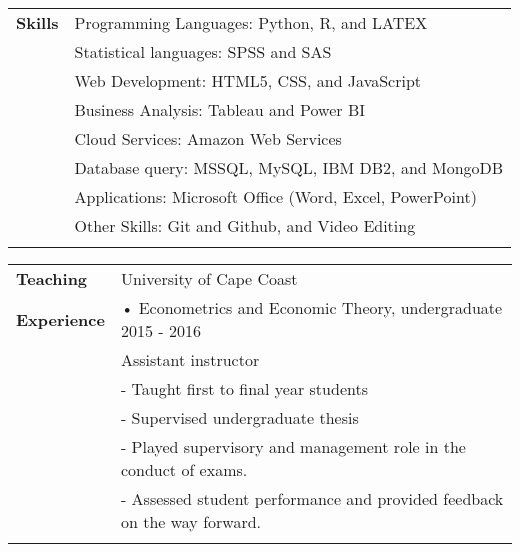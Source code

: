 \documentclass[final]{article}
\begin{document}
\begin{tabular}{@{} l l}
 \Large\textbf {Skills}    
    & \hspace{13ex} Programming Languages: \hspace{2ex} Python, R, and LATEX \\
    & \hspace{13ex} Statistical languages: \hspace{6.5ex} SPSS and SAS \\
    & \hspace{13ex} Web Development: \hspace{8.5ex} HTML5, CSS, and JavaScript\\
    & \hspace{13ex} Business Analysis: \hspace{9ex} Tableau and Power BI \\
    & \hspace{13ex} Cloud Services:  \hspace{12ex} Amazon Web Services\\
    & \hspace{13ex} Database query: \hspace{11ex} MSSQL, MySQL, IBM DB2, and MongoDB\\
    & \hspace{13ex} Applications:  \hspace{14ex} Microsoft Office (Word, Excel, PowerPoint)\\
    & \hspace{13ex} Other Skills: \hspace{14.5ex} Git and Github, and Video Editing\\
    & \\
\end{tabular}


\begin{tabular}{@{} l l}
 \Large\textbf {Teaching}    &  \hspace{3.7ex} {University of Cape Coast} \\
     \Large\textbf {Experience} & \hspace{3.7ex} • Econometrics and Economic Theory, undergraduate \hspace{8ex} 2015 - 2016 \\
    & \hspace{7ex}  Assistant instructor \\
    & \hspace{7ex} - Taught first to final year students \\
    & \hspace{7ex} - Supervised undergraduate thesis \\
    & \hspace{7ex} - Played supervisory and management role in the conduct of exams.\\
    & \hspace{7ex} - Assessed student performance and provided feedback on the way forward.\\
    & \\
\end{tabular}
\end{document}
